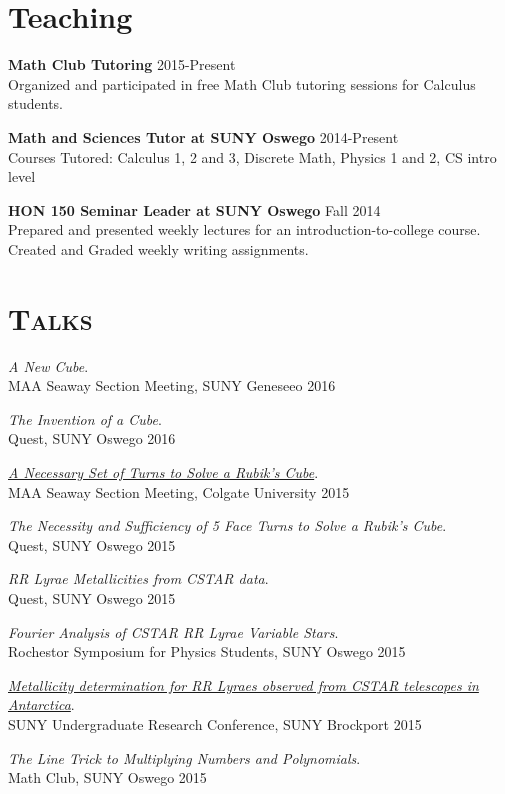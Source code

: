 \documentclass[8pt]{article}
\renewenvironment{itemize}{
  \begin{list}{}{
    \setlength{\leftmargin}{1.5em}
  }
}{
  \end{list}
}
\begin{document}
\section*{Teaching}
\begin{itemize}
\item \textbf{Math Club Tutoring} \hfill 2015-Present\\
Organized and participated in free Math Club tutoring sessions for Calculus students.
\item \textbf{Math and Sciences Tutor at SUNY Oswego} \hfill 2014-Present\\
Courses Tutored: Calculus 1, 2 and 3, Discrete Math, Physics 1 and 2, CS intro level
\item \textbf{HON 150 Seminar Leader at SUNY Oswego} \hfill Fall 2014\\
Prepared and presented weekly lectures for an introduction-to-college course. Created and Graded weekly writing assignments.
\end{itemize}

\section*{\textsc{Talks}}

\begin{itemize}
\item \emph{A New Cube}. \\
  MAA Seaway Section Meeting, SUNY Geneseeo \hfill 2016
\item \emph{The Invention of a Cube}.\\
  Quest, SUNY Oswego \hfill 2016
\item \href{http://kroffo.github.io/presentations/SeawaySpr15.pdf}{\emph{A Necessary Set of Turns to Solve a Rubik's Cube}}.\\
  MAA Seaway Section Meeting, Colgate University \hfill 2015
\item \emph{The Necessity and Sufficiency of 5 Face Turns to Solve a Rubik's Cube}.\\
  Quest, SUNY Oswego \hfill 2015
\item \emph{RR Lyrae Metallicities from CSTAR data}.\\
  Quest, SUNY Oswego \hfill 2015
\item \emph{Fourier Analysis of CSTAR RR Lyrae Variable Stars}.\\
  Rochestor Symposium for Physics Students, SUNY Oswego \hfill 2015
\item \href{http://kroffo.github.io/presentations/RRLyraeMetallicity2015.pdf}{\emph{Metallicity determination for RR Lyraes observed from CSTAR telescopes in Antarctica}}.\\
  SUNY Undergraduate Research Conference, SUNY Brockport \hfill 2015	
\item \emph{The Line Trick to Multiplying Numbers and Polynomials}.\\
  Math Club, SUNY Oswego \hfill 2015
  
\end{itemize}
\end{document}
